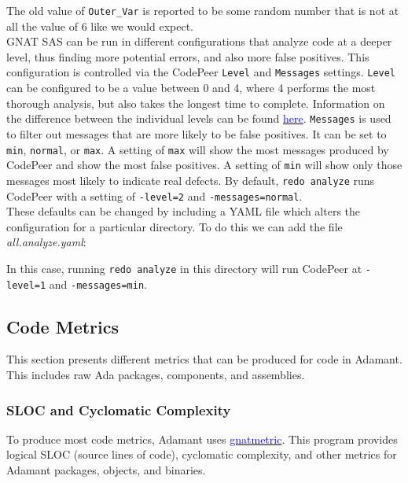The old value of \texttt{Outer\_Var} is reported to be some random number that is not at all the value of 6 like we would expect. \\

GNAT SAS can be run in different configurations that analyze code at a deeper level, thus finding more potential errors, and also more false positives. This configuration is controlled via the CodePeer \texttt{Level} and \texttt{Messages} settings. \texttt{Level} can be configured to be a value between 0 and 4, where 4 performs the most thorough analysis, but also takes the longest time to complete. Information on the difference between the individual levels can be found \href{https://docs.adacore.com/codepeer-docs/users_guide/_build/html/running.html#codepeer-levels}{\textcolor{blue}{here}}. \texttt{Messages} is used to filter out messages that are more likely to be false positives. It can be set to \texttt{min}, \texttt{normal}, or \texttt{max}. A setting of \texttt{max} will show the most messages produced by CodePeer and show the most false positives. A setting of \texttt{min} will show only those messages most likely to indicate real defects. By default, \texttt{redo analyze} runs CodePeer with a setting of \texttt{-level=2} and \texttt{-messages=normal}. \\

These defaults can be changed by including a YAML file which alters the configuration for a particular directory. To do this we can add the file \textit{all.analyze.yaml}:


In this case, running \texttt{redo analyze} in this directory will run CodePeer at \texttt{-level=1} and \texttt{-messages=min}.

\subsection{Code Metrics} \label{Code Metrics}

This section presents different metrics that can be produced for code in Adamant. This includes raw Ada packages, components, and assemblies.

\subsubsection{SLOC and Cyclomatic Complexity}

To produce most code metrics, Adamant uses \href{https://gcc.gnu.org/onlinedocs/gcc-4.8.4/gnat_ugn/The-GNAT-Metric-Tool-gnatmetric.html}{\textcolor{blue}{gnatmetric}}. This program provides logical SLOC (source lines of code), cyclomatic complexity, and other metrics for Adamant packages, objects, and binaries. \\

